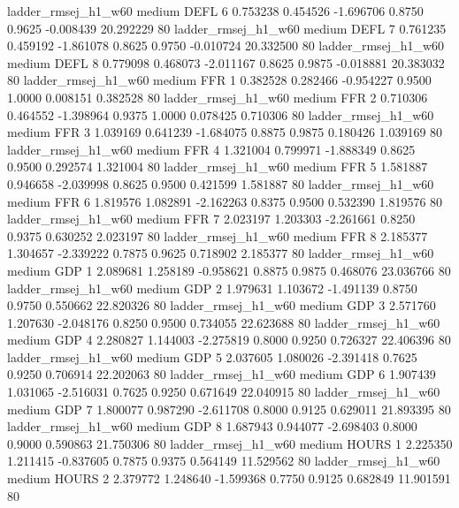    ladder_rmsej_h1_w60     medium     DEFL                 6  0.753238 0.454526 -1.696706 0.8750 0.9625 -0.008439   20.292229 80
   ladder_rmsej_h1_w60     medium     DEFL                 7  0.761235 0.459192 -1.861078 0.8625 0.9750 -0.010724   20.332500 80
   ladder_rmsej_h1_w60     medium     DEFL                 8  0.779098 0.468073 -2.011167 0.8625 0.9875 -0.018881   20.383032 80
   ladder_rmsej_h1_w60     medium      FFR                 1  0.382528 0.282466 -0.954227 0.9500 1.0000  0.008151    0.382528 80
   ladder_rmsej_h1_w60     medium      FFR                 2  0.710306 0.464552 -1.398964 0.9375 1.0000  0.078425    0.710306 80
   ladder_rmsej_h1_w60     medium      FFR                 3  1.039169 0.641239 -1.684075 0.8875 0.9875  0.180426    1.039169 80
   ladder_rmsej_h1_w60     medium      FFR                 4  1.321004 0.799971 -1.888349 0.8625 0.9500  0.292574    1.321004 80
   ladder_rmsej_h1_w60     medium      FFR                 5  1.581887 0.946658 -2.039998 0.8625 0.9500  0.421599    1.581887 80
   ladder_rmsej_h1_w60     medium      FFR                 6  1.819576 1.082891 -2.162263 0.8375 0.9500  0.532390    1.819576 80
   ladder_rmsej_h1_w60     medium      FFR                 7  2.023197 1.203303 -2.261661 0.8250 0.9375  0.630252    2.023197 80
   ladder_rmsej_h1_w60     medium      FFR                 8  2.185377 1.304657 -2.339222 0.7875 0.9625  0.718902    2.185377 80
   ladder_rmsej_h1_w60     medium      GDP                 1  2.089681 1.258189 -0.958621 0.8875 0.9875  0.468076   23.036766 80
   ladder_rmsej_h1_w60     medium      GDP                 2  1.979631 1.103672 -1.491139 0.8750 0.9750  0.550662   22.820326 80
   ladder_rmsej_h1_w60     medium      GDP                 3  2.571760 1.207630 -2.048176 0.8250 0.9500  0.734055   22.623688 80
   ladder_rmsej_h1_w60     medium      GDP                 4  2.280827 1.144003 -2.275819 0.8000 0.9250  0.726327   22.406396 80
   ladder_rmsej_h1_w60     medium      GDP                 5  2.037605 1.080026 -2.391418 0.7625 0.9250  0.706914   22.202063 80
   ladder_rmsej_h1_w60     medium      GDP                 6  1.907439 1.031065 -2.516031 0.7625 0.9250  0.671649   22.040915 80
   ladder_rmsej_h1_w60     medium      GDP                 7  1.800077 0.987290 -2.611708 0.8000 0.9125  0.629011   21.893395 80
   ladder_rmsej_h1_w60     medium      GDP                 8  1.687943 0.944077 -2.698403 0.8000 0.9000  0.590863   21.750306 80
   ladder_rmsej_h1_w60     medium    HOURS                 1  2.225350 1.211415 -0.837605 0.7875 0.9375  0.564149   11.529562 80
   ladder_rmsej_h1_w60     medium    HOURS                 2  2.379772 1.248640 -1.599368 0.7750 0.9125  0.682849   11.901591 80
